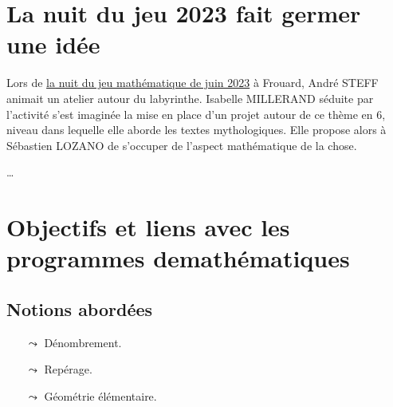 \section{La nuit du jeu 2023 fait germer une idée}
Lors de \href{https://partage.apmeplorraine.fr/petitVert/PV155.pdf#page=5}{la nuit du jeu mathématique de juin 2023} à Frouard,
André STEFF animait un atelier autour du labyrinthe. Isabelle MILLERAND séduite par l'activité s'est imaginée la mise en place d'un projet autour 
de ce thème en 6, niveau dans lequelle elle aborde les textes mythologiques. Elle propose alors à Sébastien LOZANO de s'occuper de l'aspect mathématique 
de la chose.

\dots

\section{Objectifs et liens avec les programmes demathématiques}
\subsection{Notions abordées}
    \begin{itemize}
        \item[$\leadsto$] Dénombrement.
        \item[$\leadsto$] Repérage.
        \item[$\leadsto$] Géométrie élémentaire.
    \end{itemize}

